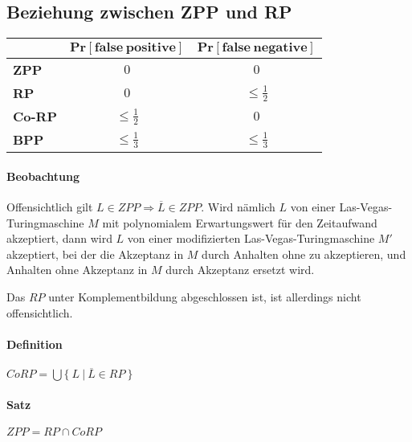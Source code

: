 \subsection{Beziehung zwischen ZPP und RP}
\bgroup
	\def\arraystretch{1.5}
	\begin{tabular}{l || c | c }
		& $\boldsymbol{Pr[false\ positive]}$ & $\boldsymbol{Pr[false\ negative]}$ \\
		\hline \hline
		\textbf{ZPP} & $0$ & $0$ \\
		\hline
		\textbf{RP} & $0$ & $\leq\frac{1}{2}$ \\
		\hline
		\textbf{Co-RP} & $\leq\frac{1}{2}$ & $0$ \\
		\hline
		\textbf{BPP} & $\leq\frac{1}{3}$ & $\leq\frac{1}{3}$ \\
	\end{tabular}
\egroup

\paragraph{Beobachtung}
Offensichtlich gilt $L \in ZPP \Rightarrow \overline{L} \in ZPP$.
Wird nämlich $L$ von einer Las-Vegas-Turingmaschine $M$ mit polynomialem Erwartungswert für den Zeitaufwand akzeptiert, dann wird $L$ von einer modifizierten Las-Vegas-Turingmaschine $M'$ akzeptiert, bei der die Akzeptanz in $M$ durch Anhalten ohne zu akzeptieren, und Anhalten ohne Akzeptanz in $M$ durch Akzeptanz ersetzt wird.

Das $RP$ unter Komplementbildung abgeschlossen ist, ist allerdings nicht offensichtlich.

\paragraph{Definition}
$CoRP = \bigcup \bigl\{\ L\ \bigl\lvert\ \overline{L} \in RP\ \}$

\paragraph{Satz}
$ZPP = RP \cap CoRP$

